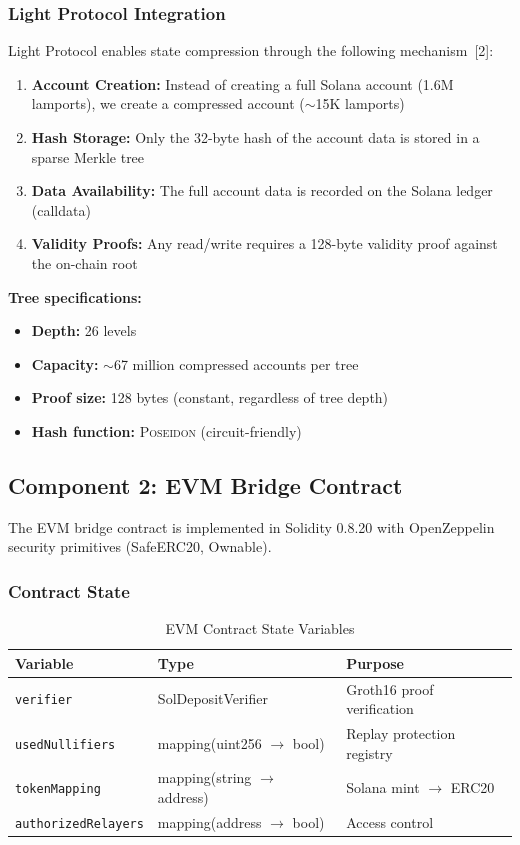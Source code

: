\documentclass[11pt,a4paper,twoside]{article}
\newcommand{\poseidon}{\textsc{Poseidon}}
\begin{document}
\subsubsection{Light Protocol Integration}

Light Protocol enables state compression through the following mechanism~[2]:

\begin{enumerate}
    \item \textbf{Account Creation:} Instead of creating a full Solana account (1.6M lamports), we create a compressed account ($\sim$15K lamports)
    \item \textbf{Hash Storage:} Only the 32-byte hash of the account data is stored in a sparse Merkle tree
    \item \textbf{Data Availability:} The full account data is recorded on the Solana ledger (calldata)
    \item \textbf{Validity Proofs:} Any read/write requires a 128-byte validity proof against the on-chain root
\end{enumerate}

\textbf{Tree specifications:}
\begin{itemize}
    \item \textbf{Depth:} 26 levels
    \item \textbf{Capacity:} $\sim$67 million compressed accounts per tree
    \item \textbf{Proof size:} 128 bytes (constant, regardless of tree depth)
    \item \textbf{Hash function:} \poseidon{} (circuit-friendly)
\end{itemize}

\subsection{Component 2: EVM Bridge Contract}

The EVM bridge contract is implemented in Solidity 0.8.20 with OpenZeppelin security primitives (SafeERC20, Ownable).

\subsubsection{Contract State}

\begin{table}[H]
\centering
\caption{EVM Contract State Variables}
\label{tab:evm-state}
\begin{tabular}{@{}lll@{}}
\toprule
\textbf{Variable} & \textbf{Type} & \textbf{Purpose} \\
\midrule
\texttt{verifier} & SolDepositVerifier & Groth16 proof verification \\
\texttt{usedNullifiers} & mapping(uint256 $\rightarrow$ bool) & Replay protection registry \\
\texttt{tokenMapping} & mapping(string $\rightarrow$ address) & Solana mint $\rightarrow$ ERC20 \\
\texttt{authorizedRelayers} & mapping(address $\rightarrow$ bool) & Access control \\
\bottomrule
\end{tabular}
\end{table}
\end{document}
